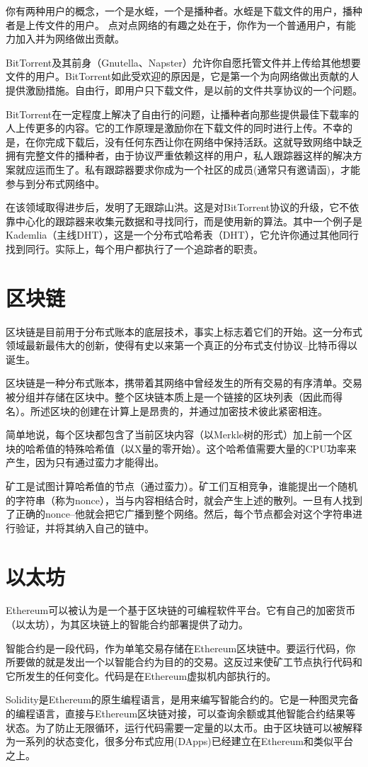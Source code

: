 \documentclass[degree=project,degree-type=project,cjk-font=noto]{thuthesis}
\begin{document}
你有两种用户的概念，一个是水蛭，一个是播种者。水蛭是下载文件的用户，播种者是上传文件的用户。
点对点网络的有趣之处在于，你作为一个普通用户，有能力加入并为网络做出贡献。

BitTorrent及其前身（Gnutella、Napster）允许你自愿托管文件并上传给其他想要文件的用户。BitTorrent如此受欢迎的原因是，它是第一个为向网络做出贡献的人提供激励措施。自由行，即用户只下载文件，是以前的文件共享协议的一个问题。

BitTorrent在一定程度上解决了自由行的问题，让播种者向那些提供最佳下载率的人上传更多的内容。它的工作原理是激励你在下载文件的同时进行上传。不幸的是，在你完成下载后，没有任何东西让你在网络中保持活跃。这就导致网络中缺乏拥有完整文件的播种者，由于协议严重依赖这样的用户，私人跟踪器这样的解决方案就应运而生了。私有跟踪器要求你成为一个社区的成员(通常只有邀请函)，才能参与到分布式网络中。

在该领域取得进步后，发明了无跟踪山洪。这是对BitTorrent协议的升级，它不依靠中心化的跟踪器来收集元数据和寻找同行，而是使用新的算法。其中一个例子是Kademlia（主线DHT），这是一个分布式哈希表（DHT），它允许你通过其他同行找到同行。实际上，每个用户都执行了一个追踪者的职责。

\section{区块链}

区块链是目前用于分布式账本的底层技术，事实上标志着它们的开始。这一分布式领域最新最伟大的创新，使得有史以来第一个真正的分布式支付协议--比特币得以诞生。

区块链是一种分布式账本，携带着其网络中曾经发生的所有交易的有序清单。交易被分组并存储在区块中。整个区块链本质上是一个链接的区块列表（因此而得名）。所述区块的创建在计算上是昂贵的，并通过加密技术彼此紧密相连。

简单地说，每个区块都包含了当前区块内容（以Merkle树的形式）加上前一个区块的哈希值的特殊哈希值（以X量的零开始）。这个哈希值需要大量的CPU功率来产生，因为只有通过蛮力才能得出。

矿工是试图计算哈希值的节点（通过蛮力）。矿工们互相竞争，谁能提出一个随机的字符串（称为nonce），当与内容相结合时，就会产生上述的散列。一旦有人找到了正确的nonce--他就会把它广播到整个网络。然后，每个节点都会对这个字符串进行验证，并将其纳入自己的链中。

\section{以太坊}

Ethereum可以被认为是一个基于区块链的可编程软件平台。它有自己的加密货币（以太坊），为其区块链上的智能合约部署提供了动力。

智能合约是一段代码，作为单笔交易存储在Ethereum区块链中。要运行代码，你所要做的就是发出一个以智能合约为目的的交易。这反过来使矿工节点执行代码和它所发生的任何变化。代码是在Ethereum虚拟机内部执行的。

Solidity是Ethereum的原生编程语言，是用来编写智能合约的。它是一种图灵完备的编程语言，直接与Ethereum区块链对接，可以查询余额或其他智能合约结果等状态。为了防止无限循环，运行代码需要一定量的以太币。由于区块链可以被解释为一系列的状态变化，很多分布式应用(DApps)已经建立在Ethereum和类似平台之上。
\end{document}
